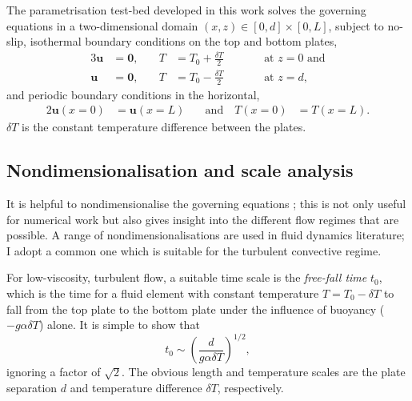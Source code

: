\documentclass[titlepage,twoside]{article}
\numberwithin{equation}{section}
\renewcommand\vec{\bm}
\begin{document}
The parametrisation test-bed developed in this work solves the governing
equations in a two-dimensional domain $(x,z) \in [0, d] \times [0, L]$, subject
to no-slip, isothermal boundary conditions on the top and bottom plates,
\begin{alignat}{3}
    \label{eqn:dim_bc_bot}
    \vec{u} &= \vec{0}, &\quad T &= T_0 + \frac{\delta T}{2}
    &\qquad& \text{at } z = 0 \text{ and} \\
    \label{eqn:dim_bc_top}
    \vec{u} &= \vec{0}, &\quad T &= T_0 - \frac{\delta T}{2}
    &\qquad& \text{at } z = d,
\end{alignat}
and periodic boundary conditions in the horizontal,
\begin{alignat}{2}
    \label{eqn:dim_bc_sides}
    \vec{u}(x=0) &= \vec{u}(x=L) &\quad \text{and} \quad T(x=0) &= T(x=L).
\end{alignat}
$\delta T$ is the constant temperature difference between the plates.

\subsection{Nondimensionalisation and scale analysis}
It is helpful to nondimensionalise the governing equations
; this is not only useful for
numerical work but also gives insight into the different flow regimes that are
possible. A range of nondimensionalisations are used in fluid dynamics
literature; I adopt a common one \parencite[see,
e.g.,][]{grotzbach1983,ouertatani2008,stevens2010} which is suitable for the
turbulent convective regime.

For low-viscosity, turbulent flow, a suitable time scale is the
\emph{free-fall time} $t_0$, which is the time for a fluid element with
constant temperature $T = T_0 - \delta T$ to fall from the top plate to
the bottom plate under the influence of buoyancy ($-g \alpha \delta T$)
alone. It is simple to show that
\[
    t_0 \sim \left( \frac{d}{g \alpha \delta T} \right)^{1/2},
\]
ignoring a factor of $\sqrt{2}$. The obvious length and temperature
scales are the plate separation $d$ and temperature difference $\delta T$,
respectively.
\end{document}
